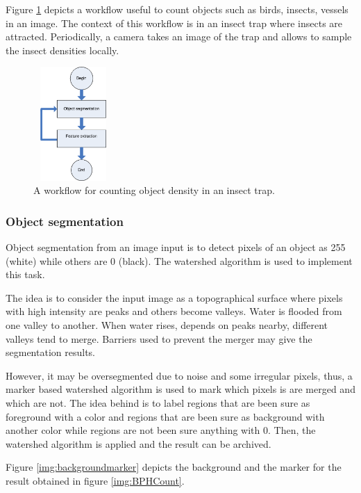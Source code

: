 \documentclass[10pt,a4paper]{article}
\begin{document}
Figure \ref{img:Count} depicts a workflow useful to count objects such as birds, insects, vessels in an image. 
The context of this workflow is in an insect trap where insects are attracted. 
Periodically, a camera takes an image of the trap and allows to sample  the insect densities locally.

\begin{figure}[ht]
\centering
\includegraphics[width=1.2in, height=1.7in]{img/Workflow1.png}
\caption{A workflow for counting object density in an insect trap.}
\label{img:Count}
\end{figure}

\subsubsection {Object segmentation}

Object segmentation from an image input is to detect pixels of an object as 255 (white) while others are  0 (black). The watershed algorithm \cite{DBLP:journals_fuin_RoerdinkM00} is used to implement this task.

The idea is to consider the input image as a topographical surface where pixels with high intensity are peaks and others become valleys. Water is flooded from one valley to another. When water rises, depends on peaks nearby, different valleys tend to merge. Barriers used to prevent the merger may give the segmentation results.

However, it may be oversegmented due to noise and some irregular pixels, thus, a marker based watershed algorithm is used to mark which pixels is are merged and which are not. The idea behind is to label regions that are been sure as foreground with a color and regions that are been sure as background with another color while regions are not been sure anything with 0. Then, the watershed algorithm is applied and the result can be archived.

Figure \ref{img:backgroundmarker} depicts the background and the marker for the result obtained in figure \ref{img:BPHCount}.
\end{document}
